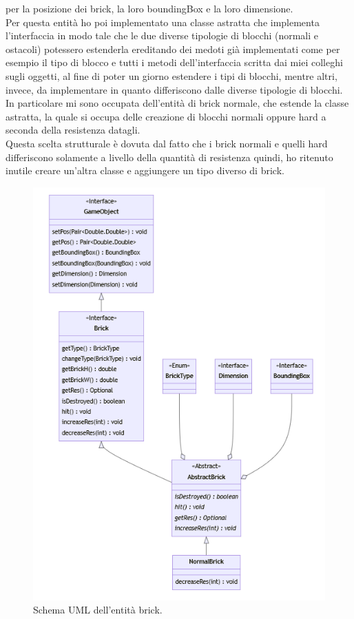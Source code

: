\documentclass[a4paper,12pt]{report}
\begin{document}
per la posizione dei brick, la loro boundingBox e la loro dimensione.
\\Per questa entità ho poi implementato una classe astratta che implementa l'interfaccia in modo tale che le due diverse tipologie di blocchi (normali e ostacoli) potessero estenderla ereditando dei medoti
già implementati come per esempio il tipo di blocco e tutti i metodi dell'interfaccia scritta dai miei colleghi sugli oggetti, al fine di poter un giorno estendere i tipi di blocchi, mentre altri, invece, da implementare in quanto differiscono dalle diverse tipologie di blocchi.
In particolare mi sono occupata dell'entità di brick normale, che estende la classe astratta, la quale si occupa delle creazione di blocchi normali oppure hard a seconda della resistenza datagli.
\\Questa scelta strutturale è dovuta dal fatto che i brick normali e quelli hard differiscono solamente a livello della quantità di resistenza quindi, ho ritenuto inutile creare un'altra classe e
aggiungere un tipo diverso di brick.
\begin{figure}[H]
    \centering{}
    \includegraphics[scale=0.6]{images/Brick.png}
    \caption{Schema UML dell'entità brick.}
    \label{images:Brick}
\end{figure}
\end{document}
